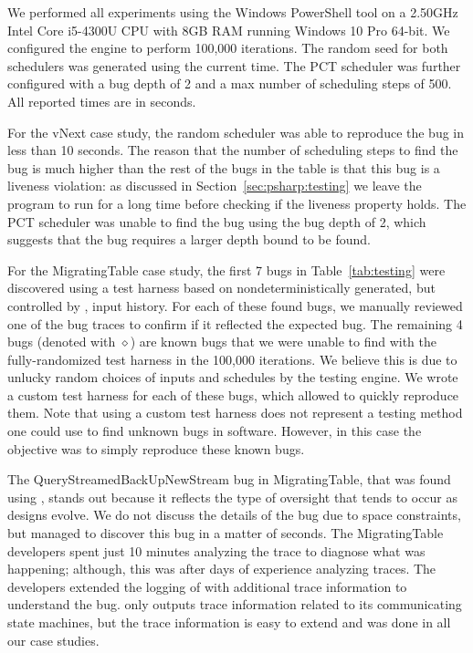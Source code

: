 We performed all experiments using the Windows PowerShell tool on a 2.50GHz Intel Core i5-4300U CPU with 8GB RAM running Windows 10 Pro 64-bit. We configured the engine to perform 100,000 iterations. The random seed for both schedulers was generated using the current time. The PCT scheduler was further configured with a bug depth of 2 and a max number of scheduling steps of 500. All reported times are in seconds.

For the vNext case study, the random scheduler was able to reproduce the bug in less than 10 seconds. The reason that the number of scheduling steps to find the bug is much higher than the rest of the bugs in the table is that this bug is a liveness violation: as discussed in Section~\ref{sec:psharp:testing} we leave the program to run for a long time before checking if the liveness property holds. The PCT scheduler was unable to find the bug using the bug depth of 2, which suggests that the bug requires a larger depth bound to be found.

For the MigratingTable case study, the first 7 bugs in Table~\ref{tab:testing} were discovered using a \psharp test harness based on nondeterministically generated, but controlled by \psharp, input history. For each of these found bugs, we manually reviewed one of the bug traces to confirm if it reflected the expected bug. The remaining 4 bugs (denoted with $\diamond$) are known bugs that we were unable to find with the fully-randomized test harness in the 100,000 iterations. We believe this is due to unlucky random choices of inputs and schedules by the \psharp testing engine. We wrote a custom \psharp test harness for each of these bugs, which allowed \psharp to quickly reproduce them. Note that using a custom test harness does not represent a testing method one could use to find unknown bugs in software. However, in this case the objective was to simply reproduce these known bugs.

The QueryStreamedBackUpNewStream bug in MigratingTable, that was found using \psharp, stands out because it reflects the type of oversight that tends to occur as designs evolve. We do not discuss the details of the bug due to space constraints, but \psharp managed to discover this bug in a matter of seconds. The MigratingTable developers spent just 10 minutes analyzing the trace to diagnose what was happening; although, this was after days of experience analyzing traces. The developers extended the logging of \psharp with additional trace information to understand the bug. \psharp only outputs trace information related to its communicating state machines, but the trace information is easy to extend and was done in all our case studies.

